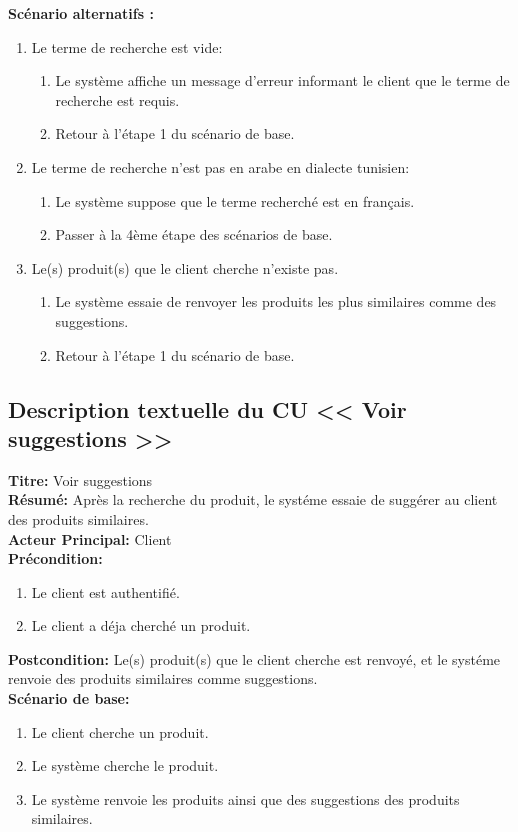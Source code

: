 \textbf{Scénario alternatifs : }
\begin{enumerate}
	\item Le terme de recherche est vide:
	      \begin{enumerate}
		      \item Le système affiche un message d'erreur informant le client que le terme de recherche est requis.
		      \item Retour à l'étape 1 du scénario de base.
	      \end{enumerate}
	\item Le terme de recherche n'est pas en arabe en dialecte tunisien:
	      \begin{enumerate}
		      \item Le système suppose que le terme recherché est en français.
		      \item Passer à la 4ème étape des scénarios de base.
	      \end{enumerate}

	\item Le(s) produit(s) que le client cherche n'existe pas.
	      \begin{enumerate}
		      \item Le système essaie de renvoyer les produits les plus similaires comme des suggestions.
		      \item Retour à l'étape 1 du scénario de base.
	      \end{enumerate}
\end{enumerate}

\subsection{Description textuelle du CU << Voir suggestions >>}
\noindent
\textbf{Titre:} Voir suggestions \\
\textbf{Résumé:} Après la recherche du produit, le systéme essaie de suggérer au client des produits similaires. \\
\textbf{Acteur Principal:} Client \\
\textbf{Précondition:} \begin{enumerate}
	\item Le client est authentifié.
	\item Le client a déja cherché un produit.
\end{enumerate}
\textbf{Postcondition:} Le(s) produit(s) que le client cherche est renvoyé, et le systéme renvoie des produits similaires comme suggestions. \\
\textbf{Scénario de base: }
\begin{enumerate}
	\item Le client cherche un produit.
	\item Le système cherche le produit.
	\item Le système renvoie les produits ainsi que des suggestions des produits similaires.
\end{enumerate}

